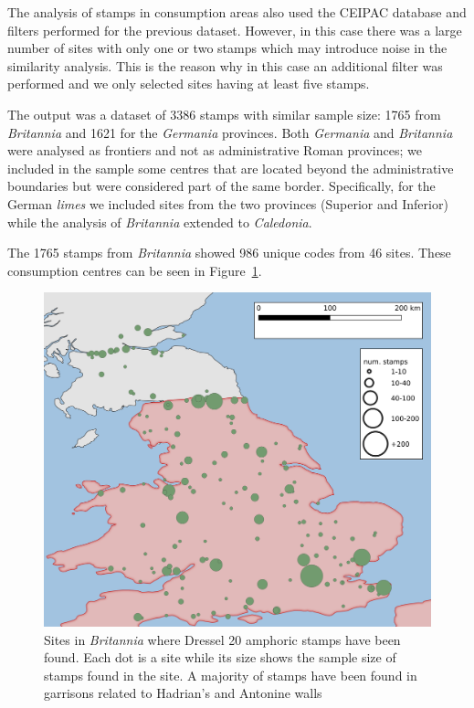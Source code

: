 The analysis of stamps in consumption areas also used the CEIPAC database and filters performed for the previous dataset. However, in this case there was a large number of sites with only one or two stamps which may introduce noise in the similarity analysis. This is the reason why in this case an additional filter was performed and we only selected sites having at least five stamps.

The output was a dataset of 3386 stamps with similar sample size: 1765 from \textit{Britannia} and 1621 for the \textit{Germania} provinces. Both \textit{Germania} and \textit{Britannia} were analysed as frontiers and not as administrative Roman provinces; we included in the sample some centres that are located beyond the administrative boundaries but were considered part of the same border. Specifically, for the German \textit{limes} we included sites from the two provinces (Superior and Inferior) while the analysis of \textit{Britannia} extended to \textit{Caledonia}.
 
The 1765 stamps from \textit{Britannia} showed 986 unique codes from 46 sites. These consumption centres can be seen in Figure~\ref{britannia}.
 
\begin{figure}[htp]
	\centering
\includegraphics[width=\linewidth]{britannia}
\caption{Sites in \textit{Britannia} where Dressel 20 amphoric stamps have been found. Each dot is a site while its size shows the sample size of stamps found in the site. A majority of stamps have been found in garrisons related to Hadrian's and Antonine walls}
\label{britannia}
\end{figure} 

